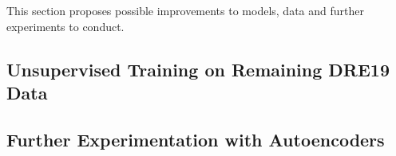 This section proposes possible improvements to models, data and further experiments to conduct. 

\subsection{Unsupervised Training on Remaining DRE19 Data}

\subsection{Further Experimentation with Autoencoders}

\subsection{}



